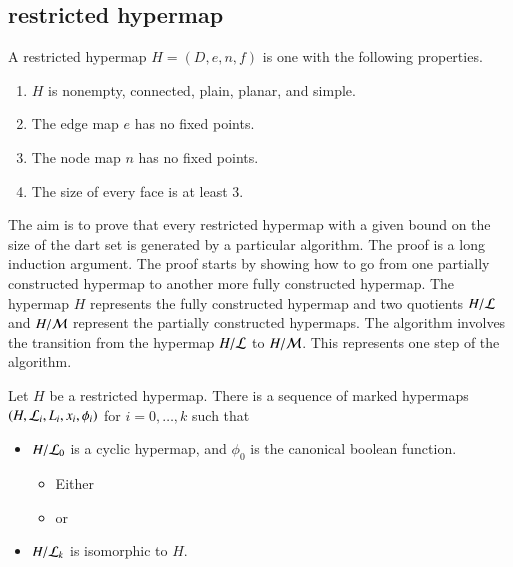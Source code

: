 \subsection{restricted hypermap}

\begin{definition}[restricted]\label{def:restricted}
A restricted hypermap $H = (D,e,n,f)$ is one with the following
properties.
\begin{enumerate}
\item $H$ is nonempty, connected, plain, planar, and simple.
\item The edge map $e$ has no fixed points.
\item The node map $n$ has no fixed points.
\item The size of every face is at least $3$.
\end{enumerate}
%
%
\end{definition}



The aim is to prove that every restricted hypermap with a given bound
on the size of the dart set is generated by a particular algorithm.
The proof is a long induction argument.  The proof starts by showing
how to go from one partially constructed hypermap to another more
fully constructed hypermap.  The hypermap $H$ represents the fully
constructed hypermap and two quotients $H/{\cal L}$ and $H/{\cal M}$
represent the partially constructed hypermaps.  The algorithm involves
the transition from the hypermap $H/{\cal L}$ to $H/{\cal M}$.  This
represents one step of the algorithm.  %

\begin{lemma}  Let $H$ be a restricted hypermap.  
There is a sequence of marked hypermaps
$(H,{\cal L}_i,L_i,x_i,\phi_i)$ for $i=0,\ldots,k$ such that
\begin{itemize}
\item $H/{\cal L}_0$ is a cyclic hypermap,  and $\phi_0$ is
the canonical boolean function.

\begin{itemize}
\item Either
\item or
\end{itemize}
\item $H/{\cal L}_k$ is isomorphic to $H$.
\end{itemize}
\end{lemma}

